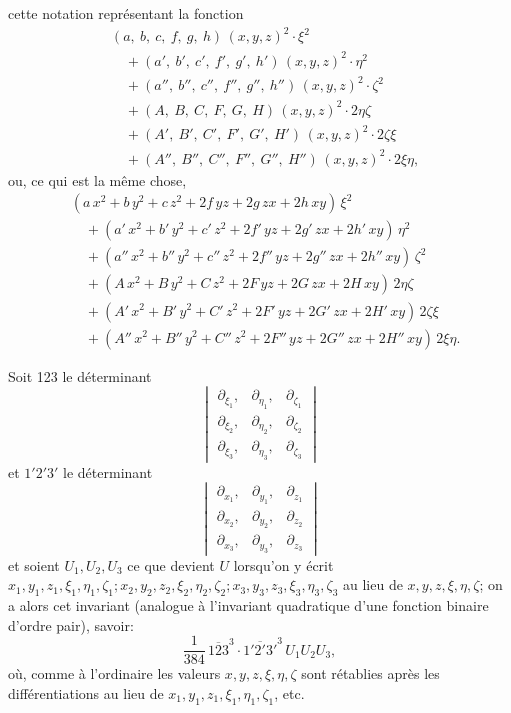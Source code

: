 \documentclass[11pt]{article}
\begin{document}
\noindent cette notation repr\'esentant la fonction
\[
\begin{aligned}
   &(a,\ b,\ c,\ f,\ g,\ h)\,(x, y, z)^2\cdot\xi^2\\
   &\quad{} + (a',\ b',\ c',\ f',\ g',\ h')\,(x, y, z)^2\cdot\eta^2\\
   &\quad{} + (a'',\ b'',\ c'',\ f'',\ g'',\ h'')\,(x, y, z)^2\cdot\zeta^2\\
   &\quad{} + (A,\ B,\ C,\ F,\ G,\ H)\,(x, y, z)^2\cdot 2\eta\zeta\\
   &\quad{} + (A',\ B',\ C',\ F',\ G',\ H')\,(x, y, z)^2\cdot 2\zeta\xi\\
   &\quad{} + (A'',\ B'',\ C'',\ F'',\ G'',\ H'')\,(x, y, z)^2\cdot 2\xi\eta,
\end{aligned}
\]
ou, ce qui est la m\^eme chose,
\[
\begin{aligned}
   &(a\,x^2 + b\,y^2 + c\,z^2 + 2 f\,y z + 2 g\,z x + 2 h\,x y)\,\xi^2\\
   &\quad{} + (a'\,x^2 + b'\,y^2 + c'\,z^2 + 2 f'\,y z + 2 g'\,z x + 2 h'\,x y)\,\eta^2\\
   &\quad{} + (a''\,x^2 + b''\,y^2 + c''\,z^2 + 2 f''\,y z + 2 g''\,z x + 2 h''\,x y)\,\zeta^2\\
   &\quad{} + (A\,x^2 + B\,y^2 + C\,z^2 + 2 F\,y z + 2 G\,z x + 2 H\,x y)\,2\eta\zeta\\
   &\quad{} + (A'\,x^2 + B'\,y^2 + C'\,z^2 + 2 F'\,y z + 2 G'\,z x + 2 H'\,x y)\,2\zeta\xi\\
   &\quad{} + (A''\,x^2 + B''\,y^2 + C''\,z^2 + 2 F''\,y z + 2 G''\,z x + 2 H''\,x y)\,2\xi\eta.
\end{aligned}
\]

\medskip

\noindent Soit 123 le d\'eterminant
\[
\begin{vmatrix} \partial_{\xi_1}, & \partial_{\eta_1}, & \partial_{\zeta_1}\\ \partial_{\xi_2}, & \partial_{\eta_2}, & \partial_{\zeta_2}\\ \partial_{\xi_3}, & \partial_{\eta_3}, & \partial_{\zeta_3}\end{vmatrix}
\]
et $1'2'3'$ le d\'eterminant
\[
\begin{vmatrix} \partial_{x_1}, & \partial_{y_1}, & \partial_{z_1}\\ \partial_{x_2}, & \partial_{y_2}, & \partial_{z_2}\\ \partial_{x_3}, & \partial_{y_3}, & \partial_{z_3}\end{vmatrix}
\]
et soient $U_1, U_2, U_3$ ce que devient $U$ lorsqu'on y \'ecrit $x_1, y_1, z_1, \xi_1, \eta_1, \zeta_1; x_2, y_2, z_2, \xi_2, \eta_2, \zeta_2; x_3, y_3, z_3, \xi_3, \eta_3, \zeta_3$ au lieu de $x, y, z, \xi, \eta, \zeta$; on a alors cet invariant (analogue \`a l'invariant quadratique d'une fonction binaire d'ordre pair), savoir:
\[
   \frac{1}{384}\,\overline{123}^3\cdot\overline{1'2'3'}^3\,U_1 U_2 U_3,
\]
o\`u, comme \`a l'ordinaire les valeurs $x, y, z, \xi, \eta, \zeta$ sont r\'etablies apr\`es les diff\'erentiations au lieu de $x_1, y_1, z_1, \xi_1, \eta_1, \zeta_1$, etc.
\end{document}
